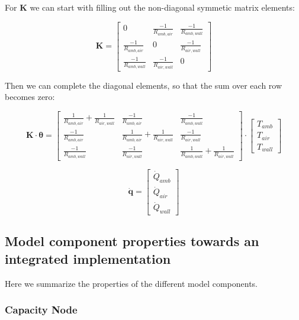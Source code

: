 For $\mathbf{K}$ we can start with filling out the non-diagonal symmetic matrix elements:

\begin{equation}
		\mathbf{K} =
	\begin{bmatrix}
		0  & \frac{-1}{R_{amb,air}} & \frac{-1}{R_{amb,wall}}  \\
		\frac{-1}{R_{amb, air}} &  0 &  \frac{-1}{R_{air,wall}} \\
		\frac{-1}{R_{amb,wall}} & \frac{-1}{R_{air, wall}}  & 0 
	\end{bmatrix}
\end{equation}

Then we can complete the diagonal elements, so that the sum over each row becomes zero:

\begin{equation}
	\mathbf{K} \cdot \boldsymbol{\theta} =
	\begin{bmatrix}
		\frac{1}{R_{amb, air}} + \frac{1}{R_{air,wall}}  & \frac{-1}{R_{amb,air}} & \frac{-1}{R_{amb,wall}}  \\
		\frac{-1}{R_{amb, air}} &  \frac{1}{R_{amb, air}} + \frac{1}{R_{air,wall}} &  \frac{-1}{R_{air,wall}} \\
		\frac{-1}{R_{amb,wall}} & \frac{-1}{R_{air, wall}}  & \frac{1}{R_{amb, wall}} + \frac{1}{R_{air,wall}} 
	\end{bmatrix}
	\cdot
	\begin{bmatrix}
		T_{amb} \\
		T_{air} \\
		T_{wall}
	\end{bmatrix}
\end{equation}

\begin{equation}
	\mathbf{\dot{q}} =
	\begin{bmatrix}
		\dot{Q}_{amb}\\
		\dot{Q}_{air} \\
		\dot{Q}_{wall} 
	\end{bmatrix}
\end{equation}

\newpage

\subsection{Model component properties towards an integrated implementation}
Here we summarize the properties of the different model components. 

\subsubsection{Capacity Node} \label{sec:capnode}

